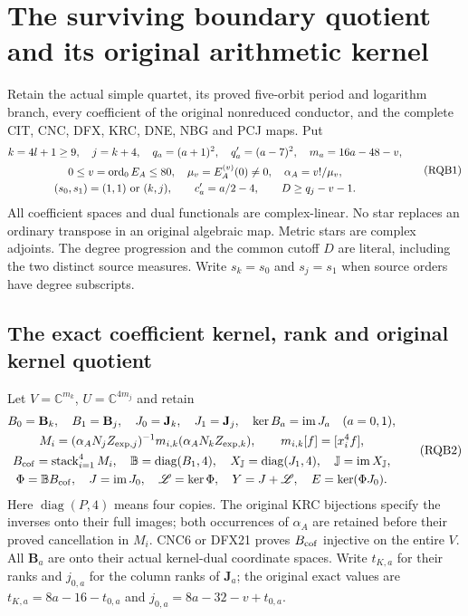 \documentclass[10pt]{article}
\begin{document}
\section{The surviving boundary quotient and its original arithmetic kernel}
\label{sec:RQB}

Retain the actual simple quartet, its proved five-orbit period and logarithm
branch, every coefficient of the original nonreduced conductor, and the
complete CIT, CNC, DFX, KRC, DNE, NBG and PCJ maps. Put
\[
\begin{gathered}
 k=4l+1\ge9,\quad j=k+4,\quad q_a=(a+1)^2,\quad q'_a=(a-7)^2,
 \quad m_a=16a-48-v,\\
 0\le v=\operatorname{ord}_0E_A\le80,\quad
 \mu_v=E_A^{(v)}(0)\ne0,\quad \alpha_A=v!/\mu_v,\\
 (s_0,s_1)=(1,1)\ \hbox{or}\ (k,j),\qquad
 c'_a=a/2-4,\qquad D\ge q_j-v-1 .
\end{gathered}\tag{RQB1}
\]
All coefficient spaces and dual functionals are complex-linear. No star
replaces an ordinary transpose in an original algebraic map. Metric stars
are complex adjoints. The degree progression and the common cutoff $D$
are literal, including the two distinct source measures. Write
$s_k=s_0$ and $s_j=s_1$ when source orders have degree subscripts.

\subsection{The exact coefficient kernel, rank and original kernel quotient}

Let $V=\mathbb C^{m_k}$, $U=\mathbb C^{4m_j}$ and retain
\[
\begin{gathered}
 B_0=\mathbf B_k,\quad B_1=\mathbf B_j,\quad
 J_0=\mathbf J_k,\quad J_1=\mathbf J_j,\quad
 \ker B_a=\operatorname{im}J_a\quad(a=0,1),\\
 M_i=(\alpha_A N_jZ_{\exp,j})^{-1}
          m_{i,k}(\alpha_A N_kZ_{\exp,k}),\qquad m_{i,k}[f]=[x_i^4f],\\
 B_{\rm cof}=\operatorname{stack}_{i=1}^4M_i,\quad
 \mathbb B=\operatorname{diag}(B_1,4),\quad
 X_{\mathbb J}=\operatorname{diag}(J_1,4),\quad
 \mathbb J=\operatorname{im}X_{\mathbb J},\\
 \Phi=\mathbb B B_{\rm cof},\quad J=\operatorname{im}J_0,\quad
 \mathscr L=\ker\Phi,\quad Y=J+\mathscr L,\quad
 E=\ker(\Phi J_0).
\end{gathered}\tag{RQB2}
\]
Here $\operatorname{diag}(P,4)$ means four copies. The original KRC
bijections specify the inverses onto their full images; both occurrences
of $\alpha_A$ are retained before their proved cancellation in $M_i$.
CNC6 or DFX21 proves $B_{\rm cof}$ injective on the entire $V$.
All $\mathbf B_a$ are onto their actual kernel-dual coordinate spaces.
Write $t_{K,a}$ for their ranks and $j_{0,a}$ for the column ranks of
$\mathbf J_a$; the original exact values are
$t_{K,a}=8a-16-t_{0,a}$ and $j_{0,a}=8a-32-v+t_{0,a}$.
\end{document}
